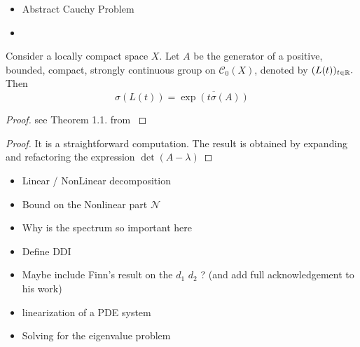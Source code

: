 \begin{itemize}
	\item Abstract Cauchy Problem
	\item 
\end{itemize}


\begin{theorem} 
	Consider a locally compact space $X$. Let $A$ be the generator of a positive, bounded, compact, strongly continuous group on $\mathcal C_0(X)$, denoted by $(L(t))_{t\in\mathbb{R}}.$ Then
	$$\sigma(L(t)) = \overline{\exp(t \sigma(A))}$$
\end{theorem}

\begin{proof}
	see Theorem 1.1. from \cite{Arendt1984}
\end{proof}


%
%


\begin{proof}
	It is a straightforward computation. The result is obtained by expanding and refactoring the expression $\det(A - \lambda)$
\end{proof}

\begin{itemize}
    \item Linear / NonLinear decomposition
    \item Bound on the Nonlinear part $\mathcal N$
    
    \item Why is the spectrum so important here
    \item Define DDI
    \item Maybe include Finn's result on the $d_1$ $d_2$ ? (and add full acknowledgement to his work)
    \item linearization of a PDE system
    \item Solving for the eigenvalue problem   
\end{itemize}